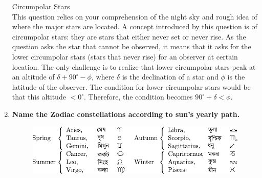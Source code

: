 \documentclass[a4paper,12pt]{extarticle}
\begin{document}
\begin{enumerate}
\begin{sol}
	\textsf{Circumpolar Stars}\\
	
	This question relies on your comprehension of the night sky and rough idea of where the major stars are located. A concept introduced by this question is of circumpolar stars: they are stars that either never set or never rise. As the question asks the star that cannot be observed, it means that it asks for the lower circumpolar stars (stars that never rise) for an observer at certain location.
	The only challenge is to realize that lower circumpolar stars peak at an altitude of $\delta+ 90^\circ -\phi$,
	where $\delta$ is the declination of a star and $\phi$ is the latitude of the observer. The condition for lower
	circumpolar stars would be that this altitude $< 0^\circ$. Therefore, the condition becomes $90^\circ + \delta <\phi$.
\end{sol}
\clearpage	
	\item \textbf{Name the Zodiac constellations according to sun's yearly path.} 
	
	\begin{figure}[H]
		\centering
		\includegraphics[width=0.7\linewidth]{zodiac.pdf}
	\end{figure}


\end{enumerate}
\end{document}
